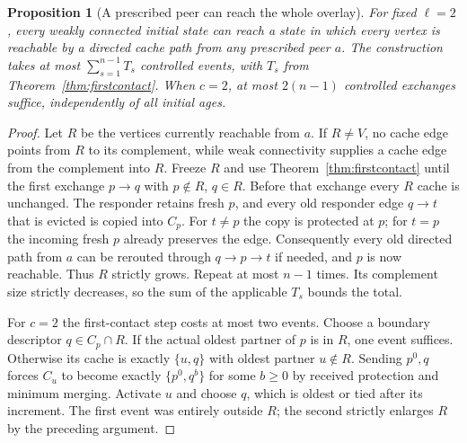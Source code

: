 \documentclass[11pt]{article}
\newtheorem{proposition}[theorem]{Proposition}
\begin{document}
\begin{proposition}[A prescribed peer can reach the whole overlay]
\label{prop:rootreachability}
For fixed $\ell=2$, every weakly connected initial state
can reach a state in which every vertex is reachable by
a directed cache path from any prescribed peer $a$.
The construction takes at most $\sum_{s=1}^{n-1}T_s$
controlled events, with $T_s$ from
Theorem~\ref{thm:firstcontact}.
When $c=2$, at most $2(n-1)$ controlled exchanges suffice,
independently of all initial ages.
\end{proposition}
\begin{proof}
Let $R$ be the vertices currently reachable from $a$.
If $R\ne V$, no cache edge points from $R$ to its
complement, while weak connectivity supplies a cache edge
from the complement into $R$.
Freeze $R$ and use Theorem~\ref{thm:firstcontact} until
the first exchange $p\to q$ with $p\notin R$, $q\in R$.
Before that exchange every $R$ cache is unchanged.
The responder retains fresh $p$, and every old responder
edge $q\to t$ that is evicted is copied into $C_p$.
For $t\ne p$ the copy is protected at $p$; for $t=p$
the incoming fresh $p$ already preserves the edge.
Consequently every old directed path from $a$ can be
rerouted through $q\to p\to t$ if needed, and $p$
is now reachable. Thus $R$ strictly grows. Repeat at
most $n-1$ times. Its complement size strictly decreases,
so the sum of the applicable $T_s$ bounds the total.

For $c=2$ the first-contact step costs at most two events.
Choose a boundary descriptor $q\in C_p\cap R$.
If the actual oldest partner of $p$ is in $R$, one
event suffices. Otherwise its cache is exactly
$\{u,q\}$ with oldest partner $u\notin R$.
Sending $p^0,q$ forces $C_u$ to become exactly
$\{p^0,q^b\}$ for some $b\ge0$ by received protection
and minimum merging. Activate $u$ and choose $q$,
which is oldest or tied after its increment.
The first event was entirely outside $R$; the second
strictly enlarges $R$ by the preceding argument.
\end{proof}
\end{document}
